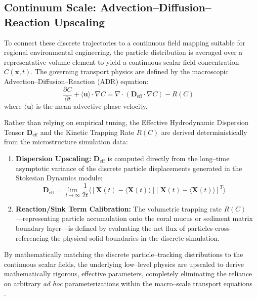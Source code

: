 \subsection{Continuum Scale: Advection--Diffusion--Reaction Upscaling}
To connect these discrete trajectories to a continuous field mapping suitable for regional environmental engineering, the particle distribution is averaged over a representative volume element to yield a continuous scalar field concentration $C(\bm{x}, t)$. The governing transport physics are defined by the macroscopic Advection--Diffusion--Reaction (ADR) equation:
\begin{equation}
    \frac{\partial C}{\partial t} + \bm{\langle u \rangle} \cdot \nabla C = \nabla \cdot \left( \bm{D}_{\text{eff}} \cdot \nabla C \right) - R(C)
\end{equation}
where $\bm{\langle u \rangle}$ is the mean advective phase velocity. 

Rather than relying on empirical tuning, the Effective Hydrodynamic Dispersion Tensor $\bm{D}_{\text{eff}}$ and the Kinetic Trapping Rate $R(C)$ are derived deterministically from the microstructure simulation data:
\begin{enumerate}
    \item \textbf{Dispersion Upscaling:} $\bm{D}_{\text{eff}}$ is computed directly from the long--time asymptotic variance of the discrete particle displacements generated in the Stokesian Dynamics module:
    \begin{equation}
        \bm{D}_{\text{eff}} = \lim_{t \to \infty} \frac{1}{2t} \langle [\bm{X}(t) - \langle \bm{X}(t) \rangle][\bm{X}(t) - \langle \bm{X}(t) \rangle]^T \rangle
    \end{equation}
    \item \textbf{Reaction/Sink Term Calibration:} The volumetric trapping rate $R(C)$---representing particle accumulation onto the coral mucus or sediment matrix boundary layer---is defined by evaluating the net flux of particles cross--referencing the physical solid boundaries in the discrete simulation.
\end{enumerate}

By mathematically matching the discrete particle--tracking distributions to the continuous scalar fields, the underlying low--level physics are upscaled to derive mathematically rigorous, effective parameters, completely eliminating the reliance on arbitrary \emph{ad hoc} parameterizations within the macro--scale transport equations \cite{brenner1993macrotransport, brenner1980dispersion, rinaldi2002body}.
